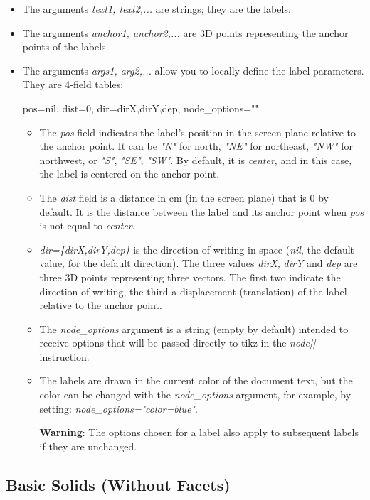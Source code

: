 \begin{itemize}
    \item The arguments \emph{text1, text2,...} are strings; they are the labels.
    \item The arguments \emph{anchor1, anchor2,...} are 3D points representing the anchor points of the labels.     \item The arguments \emph{args1, arg2,...} allow you to locally define the label parameters. They are 4-field tables:
\begin{TeXcode}
{ pos=nil, dist=0, dir={dirX,dirY,dep}, node_options="" }
\end{TeXcode}
\begin{itemize}
    \item The \emph{pos} field indicates the label's position in the screen plane relative to the anchor point. It can be \emph{"N"} for north, \emph{"NE"} for northeast, \emph{"NW"} for northwest, or \emph{"S"}, \emph{"SE"}, \emph{"SW"}. By default, it is \emph{center}, and in this case, the label is centered on the anchor point.     \item The \emph{dist} field is a distance in cm (in the screen plane) that is $0$ by default. It is the distance between the label and its anchor point when \emph{pos} is not equal to \emph{center}.
    \item \emph{dir=\{dirX,dirY,dep\}} is the direction of writing in space (\emph{nil}, the default value, for the default direction). The three values ​​\emph{dirX}, \emph{dirY} and \emph{dep} are three 3D points representing three vectors. The first two indicate the direction of writing, the third a displacement (translation) of the label relative to the anchor point.
    \item The \emph{node\_options} argument is a string (empty by default) intended to receive options that will be passed directly to tikz in the \emph{node{[}{]}} instruction.
    \item The labels are drawn in the current color of the document text, but the color can be changed with the \emph{node\_options} argument, for example, by setting: \emph{node\_options="color=blue"}.

\textbf{Warning}: The options chosen for a label also apply to subsequent labels if they are unchanged.
\end{itemize}
\end{itemize}

\subsection{Basic Solids (Without Facets)}

